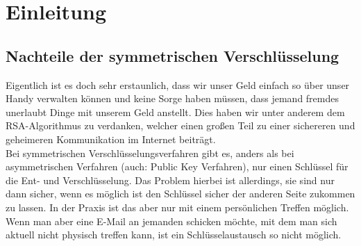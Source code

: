 \documentclass[14pt,a4paper]{scrartcl}
\begin{document}
	
\thispagestyle{empty}
\tableofcontents
\thispagestyle{empty}


\pagebreak
\section{Einleitung}
\subsection{Nachteile der symmetrischen Verschlüsselung}
Eigentlich ist es doch sehr erstaunlich, dass wir unser Geld einfach so über unser Handy verwalten können und keine Sorge haben müssen, dass jemand fremdes unerlaubt Dinge mit unserem Geld anstellt. Dies haben wir unter anderem dem RSA-Algorithmus zu verdanken, welcher einen großen Teil zu einer sichereren und geheimeren Kommunikation im Internet beiträgt.
\\

Bei symmetrischen Verschlüsselungsverfahren gibt es, anders als bei asymmetrischen Verfahren (auch: Public Key Verfahren), nur einen Schlüssel für die Ent- und Verschlüsselung. Das Problem hierbei ist allerdings, sie sind nur dann sicher, wenn es möglich ist den Schlüssel sicher der anderen Seite zukommen zu lassen. In der Praxis ist das aber nur mit einem persönlichen Treffen möglich. Wenn man aber eine E-Mail an jemanden schicken möchte, mit dem man sich aktuell nicht physisch treffen kann, ist ein Schlüsselaustausch so nicht möglich.
\end{document}
